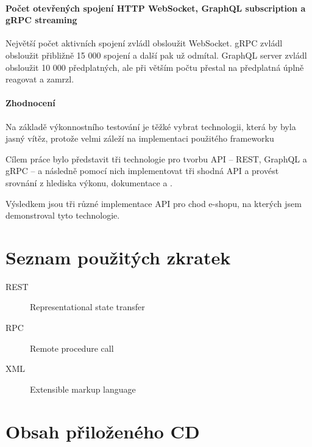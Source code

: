 \documentclass[thesis=M,czech]{FITthesis}[2019/12/23]
\begin{document}
\subsubsection*{Počet otevřených spojení HTTP WebSocket, GraphQL subscription a gRPC streaming}
Největší počet aktivních spojení zvládl obsloužit WebSocket. gRPC zvládl obsloužit přibližně 15 000 spojení a další pak už odmítal. GraphQL server zvládl obsloužit 10 000 předplatných, ale při větším počtu přestal na předplatná úplně reagovat a zamrzl.

\subsubsection*{Zhodnocení}
Na základě výkonnostního testování je těžké vybrat technologii, která by byla jasný vítěz, protože velmi záleží na implementaci použitého frameworku

\begin{conclusion}
Cílem práce bylo představit tři technologie pro tvorbu API -- REST, GraphQL a gRPC -- a následně pomocí nich implementovat tři shodná API a provést srovnání z hlediska výkonu, dokumentace a .

Výsledkem jsou tři různé implementace API pro chod e-shopu, na kterých jsem demonstroval tyto technologie.
\end{conclusion}




\appendix

\chapter{Seznam použitých zkratek}
\begin{description}
	\item[REST] Representational state transfer
	\item[RPC] Remote procedure call
	\item[XML] Extensible markup language
\end{description} 

\chapter{Obsah přiloženého CD}


\end{document}
